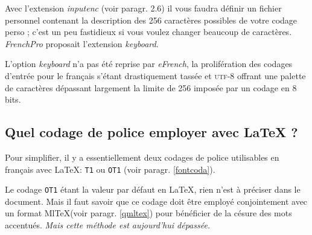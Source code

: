 \documentclass[a4paper,12pt,openright]{article}
\begin{document}
 Avec l'extension \textit{inputenc} (voir paragr. 2.6) il vous faudra définir
un fichier personnel contenant la description des 256 caractères possibles de
votre codage perso ; c'est un peu fastidieux si vous voulez changer beaucoup
de caractères.
\textit{FrenchPro} proposait l'extension \textit{keyboard}. 

\begin{MAJ}
L'option \textit{keyboard} n'a pas été reprise par \textit{eFrench},
 la prolifération des codages d'entrée pour le français s'étant 
drastiquement tassée et \textsc{utf-8} offrant une palette de caractères dépassant largement
la limite de 256 imposée par un codage en 8 bits.
\end{MAJ}
\subsection{Quel codage de police employer avec \LaTeX{} ?}
 Pour simplifier, il y a essentiellement deux codages de police utilisables
en français avec \LaTeX: \texttt{T1} ou \texttt{OT1} (voir paragr. \ref{fontcoda}).\indpos

Le codage \texttt{OT1} étant la valeur par défaut en \LaTeX, rien n'est à préciser
dans le document. Mais il faut savoir que ce codage doit être employé
conjointement avec un format Ml\TeX (voir paragr. \ref{qmltex}) pour bénéficier de la
césure des mots accentués.
{\em Mais cette méthode est aujourd'hui dépassée.}
\end{document}
